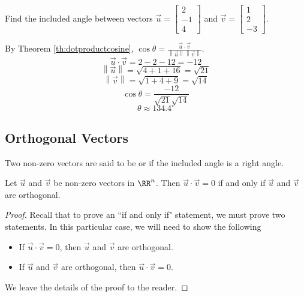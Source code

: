 \documentclass{ximera}
\newcommand\norm[1]{\left\lVert#1\right\rVert}
\begin{document}
\begin{example}\label{ex:anglebetweenvectors}
Find the included angle between vectors $\vec{u}=\begin{bmatrix}2\\-1\\4\end{bmatrix}$ and $\vec{v}=\begin{bmatrix}1\\2\\-3\end{bmatrix}$.

\begin{explanation}
By Theorem \ref{th:dotproductcosine}, $\cos \theta=\frac{\vec{u}\cdot \vec{v}}{\norm{\vec{u}}\norm{\vec{v}}}$.  
$$\vec{u}\cdot\vec{v}=2-2-12=-12$$
$$\norm{\vec{u}}=\sqrt{4+1+16}=\sqrt{21}$$
$$\norm{\vec{v}}=\sqrt{1+4+9}=\sqrt{14}$$
$$\cos\theta =\frac{-12}{\sqrt{21}\sqrt{14}}$$
$$\theta \approx 134.4^{\circ}  $$
\end{explanation}
\end{example}

\subsection*{Orthogonal Vectors}

Two non-zero vectors are said to be  or  if the included angle is a right angle.


  \begin{theorem}\label{th:orth} Let $\vec{u}$ and $\vec{v}$ be non-zero vectors in $\RR^n$. Then $\vec{u}\cdot \vec{v}=0$ if and only if $\vec{u}$ and $\vec{v}$ are orthogonal.
\end{theorem}


\begin{proof} Recall that to prove an ``if and only if" statement, we must prove two statements.  In this particular case, we will need to show the following
\begin{itemize}
\item If $\vec{u}\cdot \vec{v}=0$, then $\vec{u}$ and $\vec{v}$ are orthogonal.
\item If $\vec{u}$ and $\vec{v}$ are orthogonal, then $\vec{u}\cdot \vec{v}=0$.
\end{itemize}
We leave the details of the proof to the reader.
\end{proof}
\end{document}
